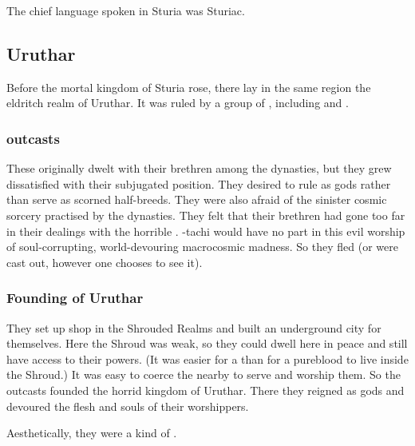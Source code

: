 The chief language spoken in Sturia was Sturiac. 









\subsection{Uruthar}
Before the mortal kingdom of Sturia rose, there lay in the same region the eldritch realm of Uruthar.
It was ruled by a group of \bezed \resphain, including  and . 





\subsubsection{\Resphain outcasts}
These \resphain originally dwelt with their brethren among the dynasties, but they grew dissatisfied with their subjugated position. 
They desired to rule as gods rather than serve as scorned half-breeds. 
They were also afraid of the sinister cosmic sorcery practised by the dynasties. 
They felt that their brethren had gone too far in their dealings with the horrible \SitraAchras.
\Lethiarch-tachi would have no part in this evil worship of soul-corrupting, world-devouring macrocosmic madness.
So they fled (or were cast out, however one chooses to see it). 





\subsubsection{Founding of Uruthar}
They set up shop in the Shrouded Realms and built an underground city for themselves.
Here the Shroud was weak, so they could dwell here in peace and still have access to their powers.
(It was easier for a \bezed than for a pureblood to live inside the Shroud.)
It was easy to coerce the nearby \humans to serve and worship them.
So the \resphan outcasts founded the horrid kingdom of Uruthar. 
There they reigned as gods and devoured the flesh and souls of their worshippers. 

Aesthetically, they were a kind of . 





